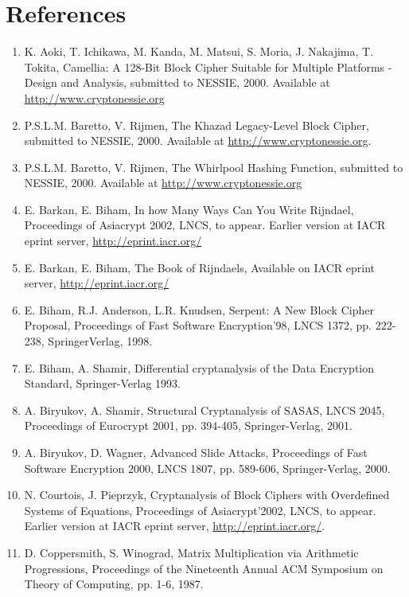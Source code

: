 \documentclass[10pt]{article}
\begin{document}
\section*{References}
\begin{enumerate}
  \item K. Aoki, T. Ichikawa, M. Kanda, M. Matsui, S. Moria, J. Nakajima, T. Tokita, Camellia: A 128-Bit Block Cipher Suitable for Multiple Platforms - Design and Analysis, submitted to NESSIE, 2000. Available at \href{http://www.cryptonessie.org}{http://www.cryptonessie.org}
  \item P.S.L.M. Baretto, V. Rijmen, The Khazad Legacy-Level Block Cipher, submitted to NESSIE, 2000. Available at \href{http://www.cryptonessie.org}{http://www.cryptonessie.org}.
  \item P.S.L.M. Baretto, V. Rijmen, The Whirlpool Hashing Function, submitted to NESSIE, 2000. Available at \href{http://www.cryptonessie.org}{http://www.cryptonessie.org}
  \item E. Barkan, E. Biham, In how Many Ways Can You Write Rijndael, Proceedings of Asiacrypt 2002, LNCS, to appear. Earlier version at IACR eprint server, \href{http://eprint.iacr.org/}{http://eprint.iacr.org/}
  \item E. Barkan, E. Biham, The Book of Rijndaels, Available on IACR eprint server, \href{http://eprint.iacr.org/}{http://eprint.iacr.org/}
  \item E. Biham, R.J. Anderson, L.R. Knudsen, Serpent: A New Block Cipher Proposal, Proceedings of Fast Software Encryption'98, LNCS 1372, pp. 222-238, SpringerVerlag, 1998.
  \item E. Biham, A. Shamir, Differential cryptanalysis of the Data Encryption Standard, Springer-Verlag 1993.
  \item A. Biryukov, A. Shamir, Structural Cryptanalysis of SASAS, LNCS 2045, Proceedings of Eurocrypt 2001, pp. 394-405, Springer-Verlag, 2001.
  \item A. Biryukov, D. Wagner, Advanced Slide Attacks, Proceedings of Fast Software Encryption 2000, LNCS 1807, pp. 589-606, Springer-Verlag, 2000.
  \item N. Courtois, J. Pieprzyk, Cryptanalysis of Block Ciphers with Overdefined Systems of Equations, Proceedings of Asiacrypt'2002, LNCS, to appear. Earlier version at IACR eprint server, \href{http://eprint.iacr.org/}{http://eprint.iacr.org/}.
  \item D. Coppersmith, S. Winograd, Matrix Multiplication via Arithmetic Progressions, Proceedings of the Nineteenth Annual ACM Symposium on Theory of Computing, pp. 1-6, 1987.

\end{enumerate}
\end{document}
